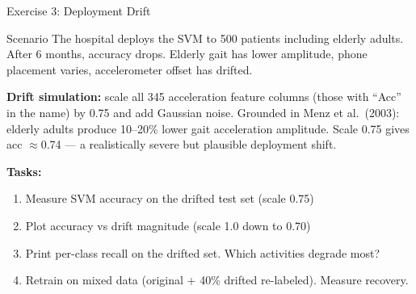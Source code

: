 \documentclass[aspectratio=169,11pt]{beamer}
\begin{document}
\begin{frame}{Exercise 3: Deployment Drift}
    \begin{block}{Scenario}
        The hospital deploys the SVM to 500 patients including elderly adults. After 6 months, accuracy drops. Elderly gait has lower amplitude, phone placement varies, accelerometer offset has drifted.
    \end{block}

    \vspace{0.2cm}
    \textbf{Drift simulation:} scale all 345 acceleration feature columns (those with ``Acc'' in the name) by 0.75 and add Gaussian noise. Grounded in Menz et al.\ (2003): elderly adults produce 10--20\% lower gait acceleration amplitude. Scale 0.75 gives acc $\approx$0.74 --- a realistically severe but plausible deployment shift.

    \vspace{0.1cm}
    \textbf{Tasks:}
    \begin{enumerate}
        \item Measure SVM accuracy on the drifted test set (scale 0.75)
        \item Plot accuracy vs drift magnitude (scale 1.0 down to 0.70)
        \item Print per-class recall on the drifted set. Which activities degrade most?
        \item Retrain on mixed data (original + 40\% drifted re-labeled). Measure recovery.
    \end{enumerate}
\end{frame}
\end{document}

